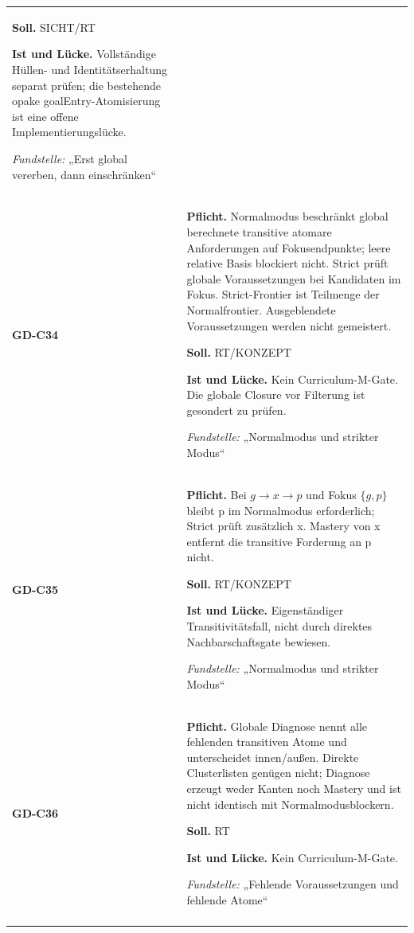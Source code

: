 \begin{longtable}{@{}P{20mm}P{128mm}@{}}
\textbf{Soll.} SICHT/RT\par\smallskip
\textbf{Ist und Lücke.} Vollständige Hüllen- und Identitätserhaltung separat prüfen; die bestehende opake goalEntry-Atomisierung ist eine offene Implementierungslücke.\par\smallskip
\emph{Fundstelle:} „Erst global vererben, dann einschränken“\\\addlinespace[5pt]
\label{rule:GD-C34}\textbf{GD-C34} &
\textbf{Pflicht.} Normalmodus beschränkt global berechnete transitive atomare Anforderungen auf Fokusendpunkte; leere relative Basis blockiert nicht. Strict prüft globale Voraussetzungen bei Kandidaten im Fokus. Strict-Frontier ist Teilmenge der Normalfrontier. Ausgeblendete Voraussetzungen werden nicht gemeistert.\par\smallskip
\textbf{Soll.} RT/KONZEPT\par\smallskip
\textbf{Ist und Lücke.} Kein Curriculum-M-Gate. Die globale Closure vor Filterung ist gesondert zu prüfen.\par\smallskip
\emph{Fundstelle:} „Normalmodus und strikter Modus“\\\addlinespace[5pt]
\label{rule:GD-C35}\textbf{GD-C35} &
\textbf{Pflicht.} Bei \(g\to x\to p\) und Fokus \(\{g,p\}\) bleibt p im Normalmodus erforderlich; Strict prüft zusätzlich x. Mastery von x entfernt die transitive Forderung an p nicht.\par\smallskip
\textbf{Soll.} RT/KONZEPT\par\smallskip
\textbf{Ist und Lücke.} Eigenständiger Transitivitätsfall, nicht durch direktes Nachbarschaftsgate bewiesen.\par\smallskip
\emph{Fundstelle:} „Normalmodus und strikter Modus“\\\addlinespace[5pt]
\label{rule:GD-C36}\textbf{GD-C36} &
\textbf{Pflicht.} Globale Diagnose nennt alle fehlenden transitiven Atome und unterscheidet innen/außen. Direkte Clusterlisten genügen nicht; Diagnose erzeugt weder Kanten noch Mastery und ist nicht identisch mit Normalmodusblockern.\par\smallskip
\textbf{Soll.} RT\par\smallskip
\textbf{Ist und Lücke.} Kein Curriculum-M-Gate.\par\smallskip
\emph{Fundstelle:} „Fehlende Voraussetzungen und fehlende Atome“\\\addlinespace[5pt]
\bottomrule
\end{longtable}
\endgroup

